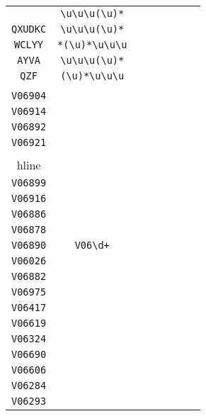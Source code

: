 \begin{longtable}{cccccccc}
\begin{tabular}{ll}
    \verb|GVNY| & \verb|\u\u\u(\u)*|\\
\verb|QXUDKC| & \verb|\u\u\u(\u)*|\\
\verb|WCLYY| & \verb|*(\u)*\u\u\u|\\
\verb|AYVA| & \verb|\u\u\u(\u)*|\\
\verb|QZF| & \verb|(\u)*\u\u\u|
\end{tabular}
\\\midrule 
\begin{tabular}{l}
    \verb|V06873|\\
\verb|V06904|\\
\verb|V06914|\\
\verb|V06892|\\
\verb|V06921|\\
\\hline\\
\verb|V06899|\\
\verb|V06916|\\
\verb|V06886|\\
\verb|V06878|\\
\verb|V06890|
\end{tabular}

&
\verb|V06\d+|
&

\begin{tabular}{l}
    \verb|V06\d\d\d|\\
\verb|V06026|\\
\verb|V06882|\\
\verb|V06975|\\
\verb|V06417|\\
\verb|V06619|
\end{tabular}

&

\begin{tabular}{l}
    \verb|V06\d\d\d|\\
\verb|V06324|\\
\verb|V06690|\\
\verb|V06606|\\
\verb|V06284|\\
\verb|V06293|
\end{tabular}

&


\end{longtable}
